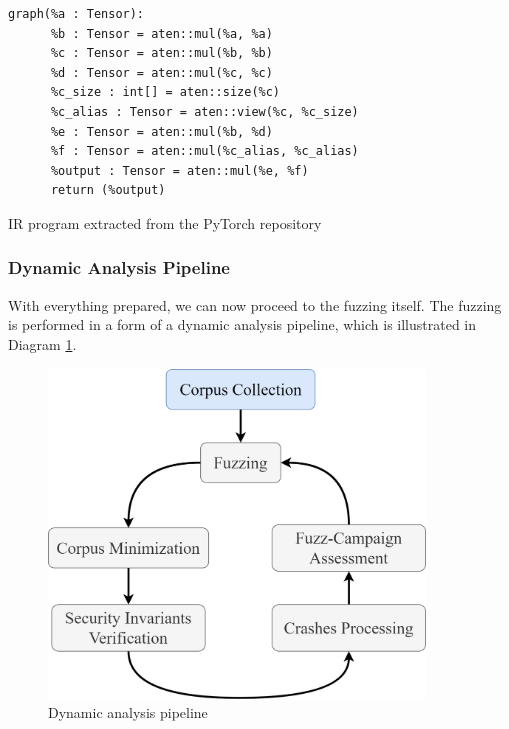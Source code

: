 \begin{listing}[h]
    \centering
    \begin{minipage}{.75\linewidth}
        \begin{verbatim}
graph(%a : Tensor):
      %b : Tensor = aten::mul(%a, %a)
      %c : Tensor = aten::mul(%b, %b)
      %d : Tensor = aten::mul(%c, %c)
      %c_size : int[] = aten::size(%c)
      %c_alias : Tensor = aten::view(%c, %c_size)
      %e : Tensor = aten::mul(%b, %d)
      %f : Tensor = aten::mul(%c_alias, %c_alias)
      %output : Tensor = aten::mul(%e, %f)
      return (%output)
    \end{verbatim}
    \end{minipage}
    \caption{IR program extracted from the PyTorch repository}
    \label{listing:ir-program}
\end{listing}

\subsubsection{Dynamic Analysis Pipeline}

With everything prepared, we can now proceed to the fuzzing itself. The fuzzing is performed in a form of a dynamic analysis pipeline, which is illustrated in Diagram \ref{fig:dynamic-analysis-pipeline}.

\begin{figure}[h]
    \centering
    \includegraphics[width=10cm]{assets/dynamic-analysis-pipeline-tnr.png}
    \caption{Dynamic analysis pipeline}
    \label{fig:dynamic-analysis-pipeline}
\end{figure}


